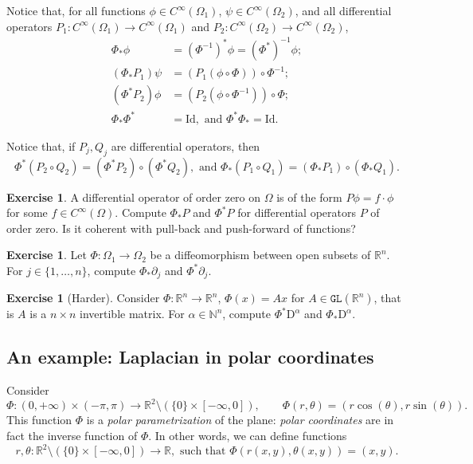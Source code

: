 \documentclass[a4paper,9pt]{amsart}
\newcommand{\N}{\mathbb{N}}	%
\newcommand{\R}{\mathbb{R}}	%
\newcommand{\Id}{\mathrm{Id}}	%
\newcommand{\de}{\partial}		%
\newcommand{\Diff}{\mathrm{D}}
\newcommand{\GL}{\mathtt{GL}}
\theoremstyle{plain}
\theoremstyle{definition}
\newtheorem{exercise}[proposition]{Exercise}%
\theoremstyle{remark}
\begin{document}
Notice that, for all functions $\phi\in C^\infty(\Omega_1)$, $\psi\in C^\infty(\Omega_2)$, 
and all differential operators $P_1:C^\infty(\Omega_1)\to C^\infty(\Omega_1)$ and $P_2:C^\infty(\Omega_2)\to C^\infty(\Omega_2)$,
\begin{align*}
	\Phi_*\phi &= (\Phi^{-1})^*\phi = (\Phi^*)^{-1}\phi ;\\
	(\Phi_*P_1)\psi & = (P_1(\phi\circ \Phi))\circ\Phi^{-1} ; \\
	(\Phi^*P_2)\phi &=  (P_2(\phi\circ\Phi^{-1}))\circ \Phi ; \\
	\Phi_* \Phi^* &= \Id,\text{ and }\Phi^*\Phi_* = \Id .
\end{align*}

Notice that, if $P_j,Q_j$ are  differential operators, then
\begin{equation}\label{eq67d7eb47}
	\Phi^*(P_2\circ Q_2) = (\Phi^*P_2)\circ (\Phi^*Q_2),
	\text{ and }
	\Phi_*(P_1\circ Q_1) = (\Phi_*P_1)\circ(\Phi_*Q_1) .
\end{equation}

\begin{exercise}
	A differential operator of order zero on $\Omega$ is of the form $P\phi = f\cdot\phi$ for some $f\in C^\infty(\Omega)$.
	Compute $\Phi_*P$ and $\Phi^*P$ for differential operators $P$ of order zero.
	Is it coherent with pull-back and push-forward of functions?
\end{exercise}

\begin{exercise}\label{ex67d7e500}
	Let $\Phi:\Omega_1\to\Omega_2$ be a diffeomorphism between open subsets of $\R^n$.
	For $j\in\{1,\dots,n\}$, compute $\Phi_*\de_j$ and $\Phi^*\de_j$.
\end{exercise}

\begin{exercise}[Harder]
	Consider $\Phi:\R^n\to\R^n$, $\Phi(x) = Ax$ for $A\in\GL(\R^n)$, that is $A$ is a $n\times n$ invertible matrix.
	For $\alpha\in\N^n$, compute $\Phi^*\Diff^\alpha$ and $\Phi_*\Diff^\alpha$.
\end{exercise}



\subsection{An example: Laplacian in polar coordinates}
Consider 
\begin{equation}
	\Phi : (0,+\infty) \times (-\pi,\pi) \to \R^2 \setminus (\{0\}\times[-\infty,0]),
	\qquad
	\Phi(r,\theta) = (r\cos(\theta),r\sin(\theta)) .
\end{equation}
This function $\Phi$ is a \emph{polar parametrization} of the plane:
\emph{polar coordinates} are in fact the inverse function of $\Phi$.
In other words, we can define functions 
\begin{equation}\label{eq67d7eca2}
	r,\theta: \R^2 \setminus (\{0\}\times[-\infty,0])\to\R ,
	\text{ such that }\Phi(r(x,y),\theta(x,y)) = (x,y) .
\end{equation}
\end{document}
